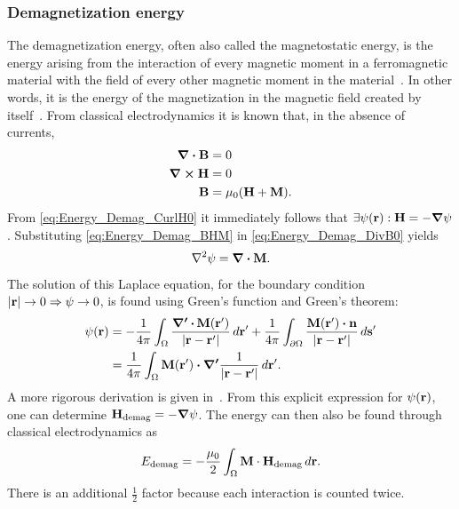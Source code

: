 \documentclass[11pt,a4paper,english]{article}
\begin{document}
\subsubsection{Demagnetization energy}
The demagnetization energy, often also called the magnetostatic energy, is the energy arising from the interaction of every magnetic moment in a ferromagnetic material with the field of every other magnetic moment in the material~\cite{NML_Carlton}. In other words, it is the energy of the magnetization in the magnetic field created by itself~\cite{abert2013discrete}.
From classical electrodynamics it is known that, in the absence of currents,
\begin{align}
	\div{\vb{B}} &= 0 \label{eq:Energy_Demag_DivB0} \\
	\curl{\vb{H}} &= 0 \label{eq:Energy_Demag_CurlH0} \\
	\vb{B} &= \mu_0 (\vb{H} + \vb{M}) \label{eq:Energy_Demag_BHM} \mathrm{.}
\end{align}
From \cref{eq:Energy_Demag_CurlH0} it immediately follows that $\exists \psi(\vb{r}): \vb{H} = -\gradient{\psi}$. Substituting \cref{eq:Energy_Demag_BHM} in \cref{eq:Energy_Demag_DivB0} yields
\begin{equation}
    \laplacian{\psi} = \div{\vb{M}} \mathrm{.}
\end{equation}
The solution of this Laplace equation, for the boundary condition $\abs{\vb{r}} \rightarrow 0 \Rightarrow \psi \rightarrow 0$, is found using Green's function and Green's theorem:
\begin{align*}
    \psi(\vb{r}) &= -\frac{1}{4\pi}\int_\Omega \frac{\boldsymbol{\nabla'\,\vdot}\,\vb{M}(\vb{r'})}{\abs{\vb{r}-\vb{r'}}} \,d\vb{r'} + \frac{1}{4\pi}\int_{\partial\Omega} \frac{\vb{M}(\vb{r'}) \vdot \vb{n}}{\abs{\vb{r}-\vb{r'}}} \,d\vb{s'} \\
    &= \frac{1}{4\pi}\int_\Omega \vb{M}(\vb{r'}) \vdot \boldsymbol{\nabla'} \frac{1}{\abs{\vb{r}-\vb{r'}}} \,d\vb{r'} \mathrm{.}
\end{align*}
A more rigorous derivation is given in~\cite{abert2013discrete}.
From this explicit expression for $\psi(\vb{r})$, one can determine $\vb{H_\mathrm{demag}} = -\gradient{\psi}$. The energy can then also be found through classical electrodynamics as
\begin{equation}
    E_\mathrm{demag} = -\frac{\mu_0}{2} \int_\Omega \vb{M} \cdot \vb{H_\mathrm{demag}} \, d\vb{r} \mathrm{.} \label{eq:Energy_Term_Demag}
\end{equation}
There is an additional $\frac{1}{2}$ factor because each interaction is counted twice.
\end{document}
